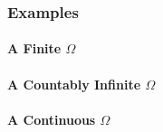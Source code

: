 

\subsubsection{Examples}

\paragraph{A Finite $\Omega$}

\paragraph{A Countably Infinite $\Omega$}

\paragraph{A Continuous $\Omega$}







